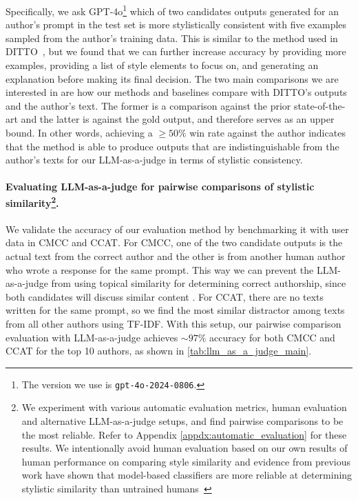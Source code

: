 Specifically, we ask GPT-4o\footnote{The version we use is \texttt{gpt-4o-2024-0806}.} which of two candidates outputs generated for an author's prompt in the test set is more stylistically consistent with five examples sampled from the author's training data.
This is similar to the method used in DITTO~\cite{shaikh2024show}, but we found that we can further increase accuracy by providing more examples, providing a list of style elements to focus on, and generating an explanation before making its final decision.  
The two main comparisons we are interested in are how our methods and baselines compare with DITTO's outputs and the author's text. 
The former is a comparison against the prior state-of-the-art and the latter is against the gold output, and therefore serves as an upper bound. 
In other words, achieving a $\geq50\%$ win rate against the author indicates that the method is able to produce outputs that are indistinguishable from the author's texts for our LLM-as-a-judge in terms of stylistic consistency. 




\paragraph{Evaluating LLM-as-a-judge for  pairwise comparisons of stylistic similarity\footnote{We experiment with various automatic evaluation metrics, human evaluation and alternative LLM-as-a-judge setups, and find pairwise comparisons to be the most reliable. Refer to Appendix \ref{appdx:automatic_evaluation} for these results. 
We intentionally avoid human evaluation based on our own results of human performance on comparing style similarity and evidence from previous work have shown that model-based classifiers are more reliable at determining stylistic similarity than untrained humans~\cite{hallinan-etal-2023-steer, krishna-etal-2020-reformulating, liu2024authorshipstyletransferpolicy, liu2024styletransfermultiiterationpreference}}.}

We validate the accuracy of our evaluation method by benchmarking it with user data in CMCC and CCAT. 
For CMCC, one of the two candidate outputs is the actual text from the correct author and the other is from another human author who wrote a response for the same prompt. 
This way we can prevent the LLM-as-a-judge from using topical similarity for determining correct authorship, since both candidates will discuss similar content \cite{wegmann-etal-2022-author}. 
For CCAT, there are no texts written for the same prompt, so we find the most similar distractor among texts from all other authors using TF-IDF. 
With this setup, our pairwise comparison evaluation with LLM-as-a-judge achieves $\sim97\%$ accuracy for both CMCC and CCAT for the top 10 authors, as shown in \autoref{tab:llm_as_a_judge_main}.



